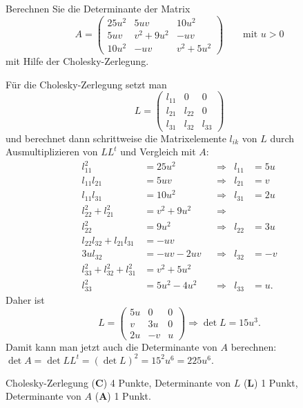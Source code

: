 %
Berechnen Sie die Determinante der Matrix 
\[
A=
\begin{pmatrix}
25u^2 &     5uv   & 10u^2 \\
5uv   &  v^2+9u^2 & -uv   \\
10u^2 &     -uv   & v^2+5u^2
\end{pmatrix}
\qquad\text{mit $u>0$}
\]
mit Hilfe der Cholesky-Zerlegung.

\begin{loesung}
Für die Cholesky-Zerlegung setzt man 
\[
L = \begin{pmatrix}
l_{11}& 0 & 0 \\
l_{21}&l_{22}& 0 \\
l_{31}&l_{32}&l_{33}
\end{pmatrix}
\]
und berechnet dann schrittweise die Matrixelemente $l_{ik}$ von $L$
durch Ausmultiplizieren von $LL^t$ und Vergleich mit $A$:
\[
\begin{aligned}
l_{11}^2                   &=  25u^2       &&\Rightarrow&    l_{11} &= 5u  \\
l_{11}l_{21}               &=  5uv         &&\Rightarrow&    l_{21} &= v   \\
l_{11}l_{31}               &=  10u^2       &&\Rightarrow&    l_{31} &= 2u  \\
l_{22}^2+l_{21}^2          &=  v^2 + 9u^2  &&\Rightarrow&           &      \\
l_{22}^2                   &=  9u^2        &&\Rightarrow&    l_{22} &= 3u  \\
l_{22}l_{32}+l_{21}l_{31}  &=  -uv         &&           &           &      \\
3ul_{32}                   &= -uv-2uv      &&\Rightarrow&    l_{32} &= -v  \\
l_{33}^2+l_{32}^2+l_{31}^2 &=  v^2+5u^2    &&           &           &      \\
l_{33}^2                   &=  5u^2-4u^2   &&\Rightarrow&    l_{33} &=  u.
\end{aligned}
\]
Daher ist
\[
L=\begin{pmatrix}
 5u &  0 & 0 \\
  v & 3u & 0 \\
 2u & -v & u
\end{pmatrix}
\Rightarrow
\det L
=
15u^3.
\]
Damit kann man jetzt auch die Determinante von $A$ berechnen:
$\det A = \det LL^t = (\det L)^2 = 15^2u^6 = 225u^6.$
\end{loesung}

\begin{bewertung}
Cholesky-Zerlegung ({\bf C}) 4 Punkte,
Determinante von $L$ ({\bf L}) 1 Punkt,
Determinante von $A$ ({\bf A}) 1 Punkt.
\end{bewertung}

